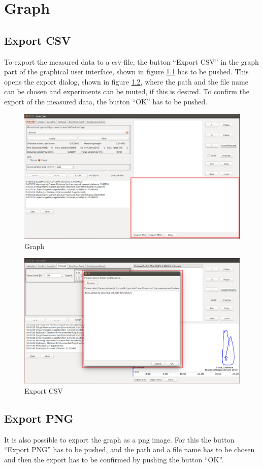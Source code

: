 \chapter{Graph}

\section{Export CSV}
To export the measured data to a csv-file, the button ``Export CSV'' in the graph part of the graphical user interface, shown in figure \ref{fig:graph} has to be pushed. This opens the export dialog, shown in figure \ref{fig:exportcsv}, where the path and the file name can be chosen and experiments can be muted, if this is desired. To confirm the export of the measured data, the button ``OK'' has to be pushed.

\begin{figure}[!ht]
	\centering
		\includegraphics[width=1.0\textwidth]{images/Graph}
	\caption{Graph}
	\label{fig:graph}
\end{figure}

\begin{figure}[!ht]
	\centering
		\includegraphics[width=1.0\textwidth]{images/ExportCSV}
	\caption{Export CSV}
	\label{fig:exportcsv}
\end{figure}

\section{Export PNG}
It is also possible to export the graph as a png image. For this the button ``Export PNG'' has to be pushed, and the path and a file name has to be chosen and then the export has to be confirmed by pushing the button ``OK''.